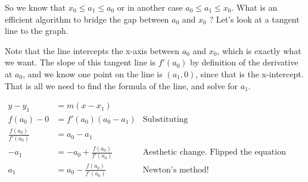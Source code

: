 \documentclass{article}
\begin{document}
\begin{center}

\end{center}


So we know that $x_0\leq a_1\leq a_0$ or in another case $a_0\leq a_1\leq x_0$. What is an efficient algorithm to bridge the gap between $a_0$ and $x_0$ ? Let's look at a tangent line to the graph.

\begin{center}

\end{center}


Note that the line intercepts the x-axis between $a_0$ and $x_0$, which is exactly what we want. The slope of this tangent line is $f'(a_0)$ by definition of the derivative at $a_0$, and we know one point on the line is $(a_1,0)$, since that is the x-intercept. That is all we need to find the formula of the line, and solve for $a_1$.

\begin{align*}
y-y_1 &= m ( x - x_1 ) &\\
f(a_0)-0 &= f'(a_0)(a_0-a_1)& \text{Substituting}\\
\frac{f(a_0)}{f'(a_0)}&=a_0-a_1 &\\
-a_1 &= -a_0 + \frac{f(a_0)}{f'(a_0)} & \text{Aesthetic change. Flipped the equation around.}\\
a_1 &= a_0 - \frac{f(a_0)}{f'(a_0)} & \text{Newton's method!}
\end{align*}
\end{document}
